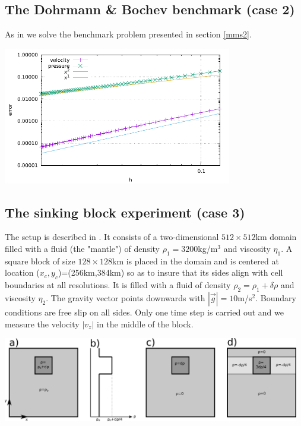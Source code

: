 \subsection*{The Dohrmann \& Bochev benchmark (case 2)} 

As in \cite{dobo04} we solve the benchmark problem presented in section \ref{mms2}.

\begin{center}
\includegraphics[width=10cm]{python_codes/fieldstone_22/results/case2/errors.pdf}
\end{center}



\subsection*{The sinking block experiment (case 3)} 

The setup is described in \cite{thba20}. 
It consists of a two-dimensional $512\times 512$km domain filled with a fluid (the "mantle") 
of density $\rho_1=3200$kg/m$^3$ and viscosity $\eta_1$. A square block of 
size $128\times 128$km is placed in the domain and is centered at location 
($x_c,y_c$)=(256km,384km) so as to insure that its sides align with cell boundaries at 
all resolutions. It is filled with a fluid of density $\rho_2=\rho_1+\delta \rho$ 
and viscosity $\eta_2$. The gravity vector points downwards with $|\vec{g}|=10$m/s$^2$. 
Boundary conditions are free slip on all sides. Only one time step is carried out and 
we measure the velocity $|v_z|$ in the middle of the block. 

\begin{center}
\includegraphics[width=13cm]{python_codes/fieldstone_22/results/case3/blocks}
\end{center}

